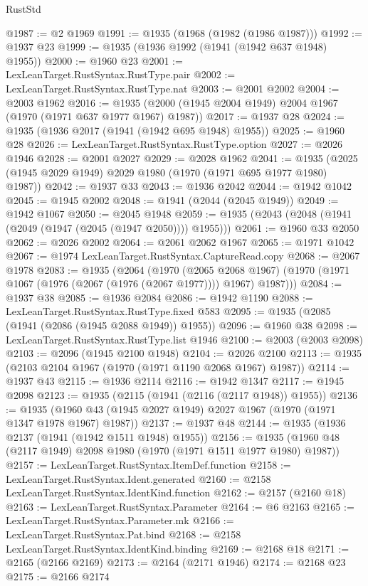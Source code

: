 \begin{lexlean}{RustStd}
\begin{coremodule}
@1987 := @2 @1969
@1991 := @1935 (@1968 (@1982 (@1986 @1987)))
@1992 := @1937 @23
@1999 := @1935 (@1936 @1992 (@1941 (@1942 @637 @1948) @1955))
@2000 := @1960 @23
@2001 := LexLeanTarget.RustSyntax.RustType.pair
@2002 := LexLeanTarget.RustSyntax.RustType.nat
@2003 := @2001 @2002
@2004 := @2003 @1962
@2016 := @1935 (@2000 (@1945 @2004 @1949) @2004 @1967 (@1970 (@1971 @637 @1977 @1967) @1987))
@2017 := @1937 @28
@2024 := @1935 (@1936 @2017 (@1941 (@1942 @695 @1948) @1955))
@2025 := @1960 @28
@2026 := LexLeanTarget.RustSyntax.RustType.option
@2027 := @2026 @1946
@2028 := @2001 @2027
@2029 := @2028 @1962
@2041 := @1935 (@2025 (@1945 @2029 @1949) @2029 @1980 (@1970 (@1971 @695 @1977 @1980) @1987))
@2042 := @1937 @33
@2043 := @1936 @2042
@2044 := @1942 @1042
@2045 := @1945 @2002
@2048 := @1941 (@2044 (@2045 @1949))
@2049 := @1942 @1067
@2050 := @2045 @1948
@2059 := @1935 (@2043 (@2048 (@1941 (@2049 (@1947 (@2045 (@1947 @2050)))) @1955)))
@2061 := @1960 @33 @2050
@2062 := @2026 @2002
@2064 := @2061 @2062 @1967
@2065 := @1971 @1042
@2067 := @1974 LexLeanTarget.RustSyntax.CaptureRead.copy
@2068 := @2067 @1978
@2083 := @1935
    (@2064
      (@1970
        (@2065 @2068 @1967)
        (@1970 (@1971 @1067 (@1976 (@2067 (@1976 (@2067 @1977)))) @1967) @1987)))
@2084 := @1937 @38
@2085 := @1936 @2084
@2086 := @1942 @1190
@2088 := LexLeanTarget.RustSyntax.RustType.fixed @583
@2095 := @1935 (@2085 (@1941 (@2086 (@1945 @2088 @1949)) @1955))
@2096 := @1960 @38
@2098 := LexLeanTarget.RustSyntax.RustType.list @1946
@2100 := @2003 (@2003 @2098)
@2103 := @2096 (@1945 @2100 @1948)
@2104 := @2026 @2100
@2113 := @1935 (@2103 @2104 @1967 (@1970 (@1971 @1190 @2068 @1967) @1987))
@2114 := @1937 @43
@2115 := @1936 @2114
@2116 := @1942 @1347
@2117 := @1945 @2098
@2123 := @1935 (@2115 (@1941 (@2116 (@2117 @1948)) @1955))
@2136 := @1935 (@1960 @43 (@1945 @2027 @1949) @2027 @1967 (@1970 (@1971 @1347 @1978 @1967) @1987))
@2137 := @1937 @48
@2144 := @1935 (@1936 @2137 (@1941 (@1942 @1511 @1948) @1955))
@2156 := @1935 (@1960 @48 (@2117 @1949) @2098 @1980 (@1970 (@1971 @1511 @1977 @1980) @1987))
@2157 := LexLeanTarget.RustSyntax.ItemDef.function
@2158 := LexLeanTarget.RustSyntax.Ident.generated
@2160 := @2158 LexLeanTarget.RustSyntax.IdentKind.function
@2162 := @2157 (@2160 @18)
@2163 := LexLeanTarget.RustSyntax.Parameter
@2164 := @6 @2163
@2165 := LexLeanTarget.RustSyntax.Parameter.mk
@2166 := LexLeanTarget.RustSyntax.Pat.bind
@2168 := @2158 LexLeanTarget.RustSyntax.IdentKind.binding
@2169 := @2168 @18
@2171 := @2165 (@2166 @2169)
@2173 := @2164 (@2171 @1946)
@2174 := @2168 @23
@2175 := @2166 @2174

\end{coremodule}
\end{lexlean}
